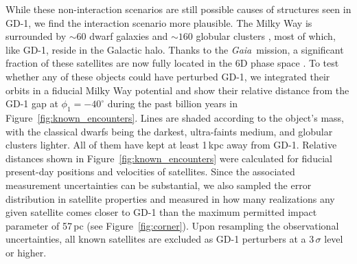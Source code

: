 \documentclass[twocolumn]{aastex62}
\newcommand{\gaia}{\textsl{Gaia}}
\begin{document}
While these non-interaction scenarios are still possible causes of structures seen in GD-1, we find the interaction scenario more plausible.
The Milky Way is surrounded by $\sim60$ dwarf galaxies \citep{mcconnachie2012} and $\sim160$ globular clusters \citep{harris2010}, most of which, like GD-1, reside in the Galactic halo.
Thanks to the \gaia\ mission, a significant fraction of these satellites are now fully located in the 6D phase space \citep{simon2018, gdr2_satellites}.
To test whether any of these objects could have perturbed GD-1, we integrated their orbits in a fiducial Milky Way potential \citep{pw2017} and show their relative distance from the GD-1 gap at $\phi_1=-40^\circ$ during the past billion years in Figure~\ref{fig:known_encounters}.
Lines are shaded according to the object's mass, with the classical dwarfs being the darkest, ultra-faints medium, and globular clusters lighter.
All of them have kept at least 1\,kpc away from GD-1.
Relative distances shown in Figure~\ref{fig:known_encounters} were calculated for fiducial present-day positions and velocities of satellites.
Since the associated measurement uncertainties can be substantial, we also sampled the error distribution in satellite properties and measured in how many realizations any given satellite comes closer to GD-1 than the maximum permitted impact parameter of 57\,pc (see Figure~\ref{fig:corner}).
Upon resampling the observational uncertainties, all known satellites are excluded as GD-1 perturbers at a $3\,\sigma$ level or higher. 
\end{document}
